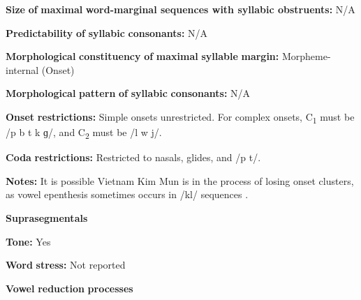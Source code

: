 \begin{styleBody}
\textbf{Size} \textbf{of} \textbf{maximal} \textbf{word{}-marginal sequences with syllabic obstruents:} N/A
\end{styleBody}

\begin{styleBody}
\textbf{Predictability} \textbf{of} \textbf{syllabic} \textbf{consonants:} N/A
\end{styleBody}

\begin{styleBody}
\textbf{Morphological} \textbf{constituency} \textbf{of} \textbf{maximal} \textbf{syllable} \textbf{margin:} Morpheme-internal (Onset)
\end{styleBody}

\begin{styleBody}
\textbf{Morphological} \textbf{pattern} \textbf{of} \textbf{syllabic} \textbf{consonants:} N/A
\end{styleBody}

\begin{styleBody}
\textbf{Onset} \textbf{restrictions:} Simple onsets unrestricted. For complex onsets, C\textsubscript{1} must be /p b t k ɡ/, and C\textsubscript{2} must be /l w j/. 
\end{styleBody}

\begin{styleBody}
\textbf{Coda} \textbf{restrictions:} Restricted to nasals, glides, and /p t/.
\end{styleBody}

\begin{styleBody}
\textbf{Notes:} It is possible Vietnam Kim Mun is in the process of losing onset clusters, as vowel epenthesis sometimes occurs in /kl/ sequences \citep[127]{Clark2008}.
\end{styleBody}

\begin{styleBody}
\textbf{Suprasegmentals}
\end{styleBody}

\begin{styleBody}
\textbf{Tone:} Yes
\end{styleBody}

\begin{styleBody}
\textbf{Word} \textbf{stress:} Not reported
\end{styleBody}

\begin{styleBody}
\textbf{Vowel} \textbf{reduction} \textbf{processes}
\end{styleBody}

